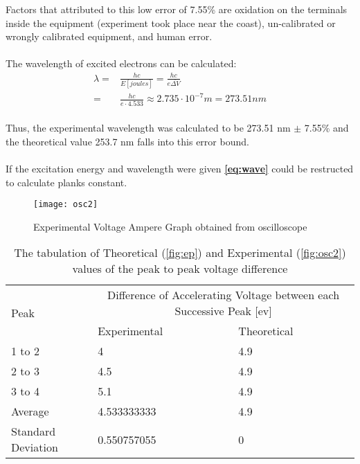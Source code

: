 \documentclass[12pt]{article}
\begin{document}
Factors that attributed to this low error of 7.55\% are oxidation on the terminals inside the equipment (experiment took place near the coast), un-calibrated or wrongly calibrated equipment,
and human error.
\\
\\
The wavelength of excited electrons can be calculated:
\begin{equation}
    \label{eq:wave}
    \begin{split}
        \lambda = & \frac{hc}{E[joules]} = \frac{hc}{e \overline{\Delta V}} \\
        = & \frac{hc}{e\cdot 4.533} \approx 2.735 \cdot 10^{-7}m = 273.51 nm
    \end{split}
\end{equation}
\\
Thus, the experimental wavelength was calculated to be 273.51 nm $\pm$ 7.55\%
and the theoretical value
253.7 nm falls into this error bound.
\\
\\
If the excitation energy and wavelength were given \textbf{\autoref{eq:wave}} could be restructed to 
calculate planks constant.

\begin{figure}[H]
    \begin{center}
        \texttt{[image: osc2]}
    \end{center}
    \caption{Experimental Voltage Ampere Graph obtained from oscilloscope}
    \label{fig:osc2}
\end{figure}

\begin{table}[H]
    \centering
    \begin{tabular}{|l|l|l|}
    \hline
    \multirow{2}{*}{Peak} & \multicolumn{2}{c|}{Difference of Accelerating Voltage between each Successive Peak [ev]} \\\cline{2-3} 
        & Experimental & Theoretical \\ \hline
        1 to 2 & 4 & 4.9 \\ \hline
        2 to 3 & 4.5 & 4.9 \\ \hline
        3 to 4 & 5.1 & 4.9 \\ \hline
        Average & 4.533333333 & 4.9 \\ \hline
        Standard Deviation & 0.550757055 & 0 \\ \hline
    \end{tabular}
    \caption{The tabulation of Theoretical (\autoref{fig:ep}) and Experimental (\autoref{fig:osc2}) values of the peak to peak voltage difference}
    \label{tab:table}

\end{table}
\end{document}
